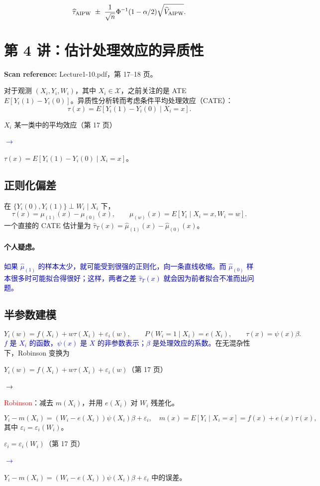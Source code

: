 \documentclass[11pt,a4paper]{article}
\newcommand{\sourcepages}[1]{\par{\small\sffamily\color{muted}\textbf{Scan reference:} #1\par}\nobreak\smallskip\nopagebreak[4]}
\newcommand{\inkblue}[1]{\textcolor{blue}{#1}}
\newcommand{\inkred}[1]{\textcolor{red}{#1}}
\newcommand{\notearrow}[3]{%
\par\Needspace{6\baselineskip}\smallskip
\noindent\begin{minipage}[c]{0.43\linewidth}\raggedright\color{#1}#2\end{minipage}%
\hfill\textcolor{#1}{\(\longrightarrow\)}\hfill%
\begin{minipage}[c]{0.43\linewidth}\raggedright#3\end{minipage}\par\smallskip}
\begin{document}
\[
\widehat\tau_{\rm AIPW}\ \pm\ \frac1{\sqrt n}\Phi^{-1}(1-\alpha/2)\sqrt{\widehat V_{\rm AIPW}}.
\]

\section{第 4 讲：估计处理效应的异质性}
\sourcepages{Lecture1-10.pdf，第 17--18 页。}
对于观测 $(X_i,Y_i,W_i)$，其中 $X_i\in\mathcal X$，之前关注的是 ATE $E[Y_i(1)-Y_i(0)]$。异质性分析转而考虑条件平均处理效应（CATE）：
\[
\tau(x)=E[Y_i(1)-Y_i(0)\mid X_i=x].
\]
\notearrow{blue}{$X_i$ 某一类中的平均效应（第 17 页）}{$\tau(x)=E[Y_i(1)-Y_i(0)\mid X_i=x]$。}
\subsection{正则化偏差}
在 $\{Y_i(0),Y_i(1)\}\perp W_i\mid X_i$ 下，
\[
\tau(x)=\mu_{(1)}(x)-\mu_{(0)}(x),\qquad
\mu_{(w)}(x)=E[Y_i\mid X_i=x,W_i=w].
\]
一个直接的 CATE 估计量为 $\widehat\tau_T(x)=\widehat\mu_{(1)}(x)-\widehat\mu_{(0)}(x)$。
\paragraph{个人疑虑。}
\inkblue{如果 $\widehat\mu_{(1)}$ 的样本太少，就可能受到很强的正则化，向一条直线收缩。而 $\widehat\mu_{(0)}$ 样本很多时可能拟合得很好；这样，两者之差 $\widehat\tau_T(x)$ 就会因为前者拟合不准而出问题。}
\subsection{半参数建模}
\[
Y_i(w)=f(X_i)+w\tau(X_i)+\varepsilon_i(w),\qquad
P(W_i=1\mid X_i)=e(X_i),\qquad \tau(x)=\psi(x)\beta.
\]
\inkblue{$f$ 是 $X_i$ 的函数，$\psi(x)$ 是 $X$ 的非参数表示；$\beta$ 是处理效应的系数。}在无混杂性下，Robinson 变换为
\notearrow{black}{$Y_i(w)=f(X_i)+w\tau(X_i)+\varepsilon_i(w)$（第 17 页）}{\inkred{Robinson}：减去 $m(X_i)$，并用 $e(X_i)$ 对 $W_i$ 残差化。}

\[
Y_i-m(X_i)=(W_i-e(X_i))\psi(X_i)\beta+\varepsilon_i,
\quad m(x)=E[Y_i\mid X_i=x]=f(x)+e(x)\tau(x),
\]
其中 $\varepsilon_i=\varepsilon_i(W_i)$。
\notearrow{blue}{$\varepsilon_i=\varepsilon_i(W_i)$（第 17 页）}{$Y_i-m(X_i)=(W_i-e(X_i))\psi(X_i)\beta+\varepsilon_i$ 中的误差。}
\end{document}
